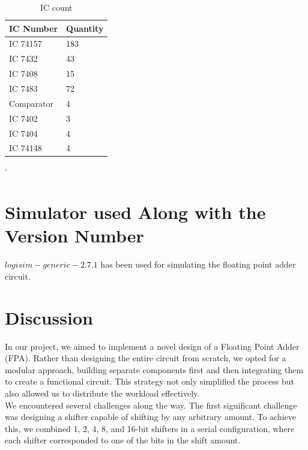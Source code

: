 \documentclass[a4paper,12pt]{article}
\begin{document}
\begin{table}[H]
    \begin{center}

        \begin{tabular}{ll}
            \hline
            IC Number  & Quantity \\ \hline \hline
            IC 74157   & 183      \\ \hline
            IC 7432    & 43       \\ \hline
            IC 7408    & 15       \\ \hline
            IC 7483    & 72       \\ \hline
            Comparator & 4        \\ \hline
            IC 7402    & 3        \\ \hline
            IC 7404    & 4        \\ \hline
            IC 74148   & 4        \\ \hline
        \end{tabular}
    \end{center}
    \caption{IC count}
\end{table}

`
\section{Simulator used Along with the Version Number}
$logisim-generic-2.7.1$ has been used for simulating the floating point adder circuit.

\section{Discussion}
In our project, we aimed to implement a novel design of a Floating Point Adder
(FPA). Rather than designing the entire circuit from scratch, we opted for a
modular approach, building separate components first and then integrating them
to create a functional circuit. This strategy not only simplified the process
but also allowed us to distribute the workload effectively.\\

We encountered several challenges along the way. The first significant
challenge was designing a shifter capable of shifting by any arbitrary amount.
To achieve this, we combined 1, 2, 4, 8, and 16-bit shifters in a serial
configuration, where each shifter corresponded to one of the bits in the shift
amount.\\
\end{document}
